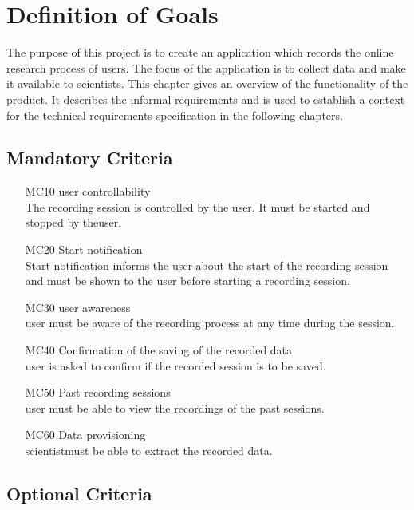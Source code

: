 \chapter{Definition of Goals}
\label{ch:goals}

The purpose of this project is to create an application which records the online research process of \glspl{user}. The focus of the application is to collect data and make it available to \glspl{scientist}. This chapter gives an overview of the functionality of the product. It describes the informal requirements and is used to establish a context for the technical requirements specification in the following chapters.

\section{Mandatory Criteria}

\begin{itemize}

	\item[MC10]\Gls{user} controllability\\The recording \gls{session} is controlled by the \gls{user}. It must be started and stopped by the\gls{user}.
	\item[MC20]Start notification\\Start notification informs the \Gls{user} about the start of the recording \gls{session} and must be shown to the user before starting a recording \gls{session}. 
	\item[MC30]\Gls{user} awareness\\\Gls{user} must be aware of the recording process at any time during the \gls{session}.
	\item[MC40]Confirmation of the saving of the recorded data\\\Gls{user} is asked to confirm if the recorded \gls{session} is to be saved.
	\item[MC50]Past recording \glspl{session}\\\Gls{user} must be able to view the recordings of the past \glspl{session}.
	\item[MC60]Data provisioning\\\Gls{scientist}must be able to extract the recorded data.
	
\end{itemize}

\section{Optional Criteria}

